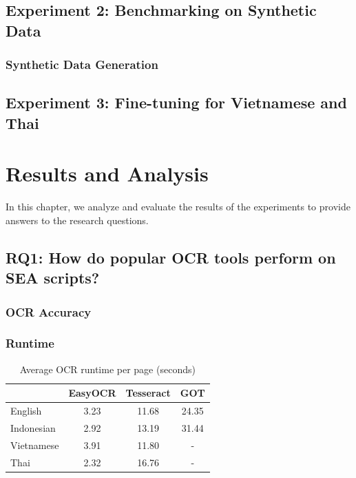\documentclass[12pt,oneside]{memoir}
\begin{document}
\section{Experiment 2: Benchmarking on Synthetic Data}

\subsection{Synthetic Data Generation}

\section{Experiment 3: Fine-tuning for Vietnamese and Thai} \label{section:experiment-3}

\chapter{Results and Analysis}

In this chapter, we analyze and evaluate the results of the experiments to provide answers to the research questions.

\section{RQ1: How do popular OCR tools perform on SEA scripts?}

\subsection{OCR Accuracy}

\subsection{Runtime}

\begin{table}[ht]
    \caption{Average OCR runtime per page (seconds)}
    \label{table:runtime}
    \centering
    \begin{tabular}{lccc}
        \toprule
        & EasyOCR & Tesseract & GOT\\ 
        \midrule
        English & 3.23 & 11.68 & 24.35\\
        Indonesian & 2.92 & 13.19 & 31.44\\
        Vietnamese & 3.91 & 11.80 & -\\
        Thai & 2.32 & 16.76 & -\\
        \bottomrule
    \end{tabular}
\end{table}
\end{document}
